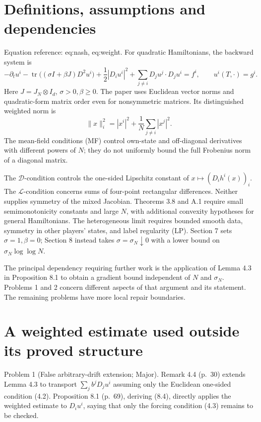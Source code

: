 \documentclass[10pt]{article}
\begin{document}
\section*{Definitions, assumptions and dependencies}
Equation reference: eq:nash, eq:weight. For quadratic Hamiltonians, the backward system is \[
-\partial_t u^i-\operatorname{tr}\bigl((\sigma I+\beta J)D^2u^i\bigr)
+\frac12|D_i u^i|^2+\sum_{j\ne i}D_j u^j\cdot D_j u^i=f^i,
\qquad u^i(T,\cdot)=g^i.\] Here \(J=J_N\otimes I_d\), \(\sigma>0,\beta\ge0\). The paper uses Euclidean vector norms and quadratic-form matrix order even for nonsymmetric matrices. Its distinguished weighted norm is \[
\|x\|_i^2=|x^i|^2+\frac1N\sum_{j\ne i}|x^j|^2.\] The mean-field conditions (MF) control own-state and off-diagonal derivatives with different powers of \(N\); they do not uniformly bound the full Frobenius norm of a diagonal matrix.\par
The \(\mathcal D\)-condition controls the one-sided Lipschitz constant of \(x\mapsto(D_i h^i(x))_i\). The \(\mathcal L\)-condition concerns sums of four-point rectangular differences. Neither supplies symmetry of the mixed Jacobian. Theorems 3.8 and A.1 require small semimonotonicity constants and large \(N\), with additional convexity hypotheses for general Hamiltonians. The heterogeneous limit requires bounded smooth data, symmetry in other players’ states, and label regularity (LP). Section 7 sets \(\sigma=1,\beta=0\); Section 8 instead takes \(\sigma=\sigma_N\downarrow0\) with a lower bound on \(\sigma_N\log\log N\).\par
The principal dependency requiring further work is the application of Lemma 4.3 in Proposition 8.1 to obtain a gradient bound independent of \(N\) and \(\sigma_N\). Problems 1 and 2 concern different aspects of that argument and its statement. The remaining problems have more local repair boundaries.\par
\section*{A weighted estimate used outside its proved structure}
Problem 1 (False arbitrary-drift extension; Major).  Remark 4.4 (p. 30) extends Lemma 4.3 to transport \(\sum_j b^jD_j u^i\) assuming only the Euclidean one-sided condition (4.2). Proposition 8.1 (p. 69), deriving (8.4), directly applies the weighted estimate to \(D_i u^i\), saying that only the forcing condition (4.3) remains to be checked.\par
\end{document}
